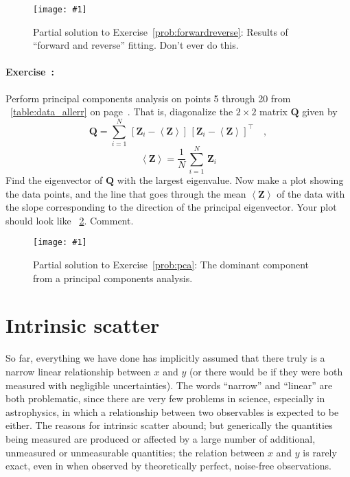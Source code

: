 \documentclass[12pt,twoside,pdftex]{article}
\newcommand{\exampleplot}[1]{%
\begin{center}%
\texttt{[image: \#1]}%
\end{center}%
}
\newcommand{\problemname}{Exercise}
\newcounter{problem}
\newenvironment{problem}{\paragraph{\problemname~\theproblem:}\refstepcounter{problem}}{}
\newcommand{\mmatrix}[1]{\boldsymbol{#1}}
\newcommand{\transpose}[1]{{#1}^{\scriptscriptstyle \top}}
\newcommand{\mQ}{\mmatrix{Q}}
\newcommand{\mZ}{\mmatrix{Z}}
\newcommand{\mean}[1]{\left<{#1}\right>}
\newcommand{\meanZ}{\mean{\mZ}}
\begin{document}
\begin{figure}[htbp]
\exampleplot{ex14}
\caption{Partial solution to \problemname~\ref{prob:forwardreverse}:
  Results of ``forward and reverse'' fitting.  Don't ever do
  this.}\label{fig:forwardreverse}
\end{figure}

\begin{problem}\label{prob:pca}
Perform principal components analysis on points 5 through 20 from
\tablename~\ref{table:data_allerr} on
page~\pageref{table:data_allerr}.  That is, diagonalize the $2\times
2$ matrix $\mQ$ given by
\begin{equation}
\mQ = \sum_{i=1}^N\,\left[\mZ_i-\meanZ\right]
  \,\transpose{\left[\mZ_i-\meanZ\right]} \quad ,
\end{equation}
\begin{equation}
\meanZ = \frac{1}{N}\,\sum_{i=1}^N\,\mZ_i
\end{equation}
Find the eigenvector of $\mQ$ with the largest eigenvalue.  Now make a
plot showing the data points, and the line that goes through the mean
$\meanZ$ of the data with the slope corresponding to the direction of
the principal eigenvector.  Your plot should look like
\figurename~\ref{fig:pca}.  Comment.
\end{problem}

\begin{figure}[htbp]
\exampleplot{ex15}
\caption{Partial solution to \problemname~\ref{prob:pca}: The dominant
component from a principal components analysis.}\label{fig:pca}
\end{figure}

\section{Intrinsic scatter}\label{sec:scatter}

So far, everything we have done has implicitly assumed that there
truly is a narrow linear relationship between $x$ and $y$ (or there
would be if they were both measured with negligible uncertainties).
The words ``narrow'' and ``linear'' are both problematic, since there
are very few problems in science, especially in astrophysics, in which
a relationship between two observables is expected to be either.  The
reasons for intrinsic scatter abound; but generically the quantities
being measured are produced or affected by a large number of
additional, unmeasured or unmeasurable quantities; the relation
between $x$ and $y$ is rarely exact, even in when observed by
theoretically perfect, noise-free observations.
\end{document}
